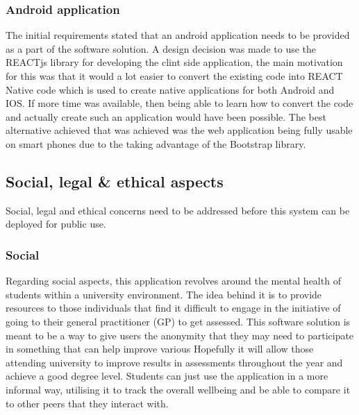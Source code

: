 \subsubsection*{Android application}
The initial requirements stated that an android application needs to be provided as a part of the software solution.
A design decision was made to use the REACTjs library for developing the clint side application, the main motivation for this was that it would a 
lot easier to convert the existing code into REACT Native code which is used to create native applications for both Android and IOS.
If more time was available, then being able to learn how to convert the code and actually create such an application would have been possible.
The best alternative achieved that was achieved was the web application being fully usable on smart phones due to the taking advantage of
the Bootstrap library.


\subsection{Social, legal \& ethical aspects}
Social, legal and ethical concerns need to be addressed before this system can be deployed for public use.

\subsubsection{Social}

Regarding social aspects, this application revolves around the mental health of students within a university environment.
The idea behind it is to provide resources to those individuals that find it difficult to engage in the initiative of going to their general practitioner
(GP) to get assessed.
This software solution is meant to be a way to give users the anonymity that they may need to participate in something that can help improve 
various 
Hopefully it will allow those attending university to improve results in assessments throughout the year and achieve a good degree level.
Students can just use the application in a more informal way, utilising it to track the overall wellbeing and be able to compare it to other peers that
they interact with.



